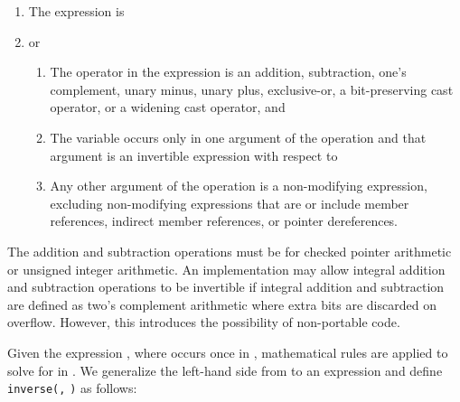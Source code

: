 \begin{enumerate}
\item
  The expression is 
\item
  or

  \begin{enumerate}
  \item
    The operator in the expression is an addition, subtraction, one's
    complement, unary minus, unary plus, exclusive-or, a bit-preserving
    cast operator, or a widening cast operator, and
  \item
    The variable  occurs only in one argument of the operation and that
    argument is an invertible expression with respect to 
  \item
    Any other argument of the operation is a non-modifying expression,
    excluding non-modifying expressions that are or include member
    references, indirect member references, or pointer dereferences.
  \end{enumerate}
\end{enumerate}

The addition and subtraction operations must be for checked pointer
arithmetic or unsigned integer arithmetic. An implementation may allow
integral addition and subtraction operations to be invertible if
integral addition and subtraction are defined as two's complement
arithmetic where extra bits are discarded on overflow. However, this
introduces the possibility of non-portable code.

Given the expression  \code{=} , where  occurs once
in , mathematical rules are applied to solve for  in
. We generalize the left-hand side from  to an expression
 and define \texttt{inverse(}\texttt{,}
\texttt{)} as follows:

